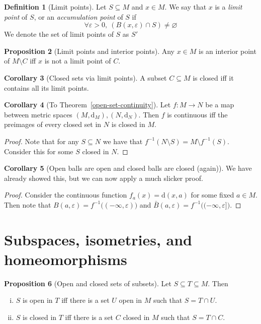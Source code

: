 \documentclass[10pt,fleqn]{article}
\newcommand{\met}{\mathrm{d}}
\newcommand{\eps}{\varepsilon}
\theoremstyle{definition} \newtheorem{defn}{Definition}[section]
\theoremstyle{plain}      \newtheorem{thm}[defn]{Theorem}
\theoremstyle{definition} \newtheorem{prop}[defn]{Proposition}
\theoremstyle{definition} \newtheorem{cor}[defn]{Corollary}
\theoremstyle{definition} \newtheorem{ex}[defn]{Example}
\theoremstyle{definition} \newtheorem{rem}[defn]{Remark}
\begin{document}
\begin{defn}[Limit points]
    Let $S\subseteq M$ and $x\in M$.
    We say that $x$ is a \emph{limit point} of $S$, or an \emph{accumulation point} of $S$ if
    \[
        \forall\eps>0,~
        (B(x,\eps)\cap S)\neq\varnothing
    \]
    We denote the set of limit points of $S$ as $S'$
\end{defn}

\begin{prop}[Limit points and interior points]
    Any $x\in M$ is an interior point of $M\setminus C$ iff $x$ is not a limit point of $C$.
\end{prop}

\begin{cor}[Closed sets via limit points]
    A subset $C\subseteq M$ is closed iff it contains all its limit points.
\end{cor}

\begin{cor}[To Theorem~\ref{open-set-continuity}]
    Let $f:M\to N$ be a map between metric spaces $(M,\met_M),(N,\met_N)$.
    Then $f$ is continuous iff the preimages of every closed set in $N$ is closed in $M$.
\end{cor}

\begin{proof}
    Note that for any $S\subseteq N$ we have that $f^{-1}(N\setminus S) = M\setminus f^{-1}(S)$.
    Consider this for some $S$ closed in $N$.
\end{proof}

\begin{cor}[Open balls are open and closed balls are closed (again)]
    We have already showed this, but we can now apply a much slicker proof.
\end{cor}

\begin{proof}
    Consider the continuous function $f_a(x)=\met(x,a)$ for some fixed $a\in M$.
    Then note that $B(a,\eps)=f^{-1}\big((-\infty,\eps)\big)$ and $\bar{B}(a,\eps)=f^{-1}\big((-\infty,\eps]\big)$.
\end{proof}


\section{Subspaces, isometries, and homeomorphisms}

\begin{prop}[Open and closed sets of subsets]
    Let $S\subseteq T\subseteq M$.
    Then
    \begin{enumerate}[(i)]
        \item $S$ is open in $T$ iff there is a set $U$ open in $M$ such that $S=T\cap U$.
        \item $S$ is closed in $T$ iff there is a set $C$ closed in $M$ such that $S=T\cap C$.
    \end{enumerate}
\end{prop}
\end{document}
